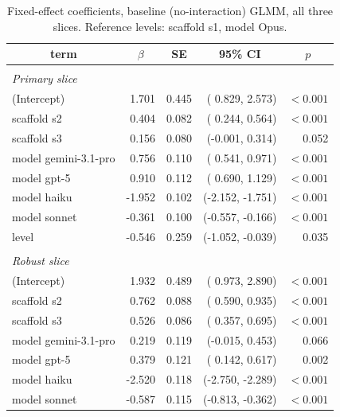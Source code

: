 \documentclass[10pt]{article} %
\begin{document}
    \begin{table}[h]
        \caption{Fixed-effect coefficients, baseline (no-interaction) GLMM, all three slices. Reference levels: scaffold s1, model Opus.}
    \label{tab:glmm_baseline_all}
    \begin{center}
    \footnotesize
    \begin{tabular}{lrrrr}
        \multicolumn{1}{c}{\bf term} & \multicolumn{1}{c}{\bf $\beta$} & \multicolumn{1}{c}{\bf SE} & \multicolumn{1}{c}{\bf 95\% CI} & \multicolumn{1}{c}{\bf $p$} \\
        \hline \\
        \multicolumn{5}{l}{\textit{Primary slice}} \\
        (Intercept)          &  1.701 & 0.445 & ( 0.829,  2.573) & $<0.001$ \\
        scaffold s2          &  0.404 & 0.082 & ( 0.244,  0.564) & $<0.001$ \\
        scaffold s3          &  0.156 & 0.080 & (-0.001,  0.314) & 0.052 \\
        model gemini-3.1-pro &  0.756 & 0.110 & ( 0.541,  0.971) & $<0.001$ \\
        model gpt-5          &  0.910 & 0.112 & ( 0.690,  1.129) & $<0.001$ \\
        model haiku          & -1.952 & 0.102 & (-2.152, -1.751) & $<0.001$ \\
        model sonnet         & -0.361 & 0.100 & (-0.557, -0.166) & $<0.001$ \\
        level                & -0.546 & 0.259 & (-1.052, -0.039) & 0.035 \\
        \hline \\
        \multicolumn{5}{l}{\textit{Robust slice}} \\
        (Intercept)          &  1.932 & 0.489 & ( 0.973,  2.890) & $<0.001$ \\
        scaffold s2          &  0.762 & 0.088 & ( 0.590,  0.935) & $<0.001$ \\
        scaffold s3          &  0.526 & 0.086 & ( 0.357,  0.695) & $<0.001$ \\
        model gemini-3.1-pro &  0.219 & 0.119 & (-0.015,  0.453) & 0.066 \\
        model gpt-5          &  0.379 & 0.121 & ( 0.142,  0.617) & 0.002 \\
        model haiku          & -2.520 & 0.118 & (-2.750, -2.289) & $<0.001$ \\
        model sonnet         & -0.587 & 0.115 & (-0.813, -0.362) & $<0.001$ \\

\end{tabular}
\end{center}
\end{table}
\end{document}
